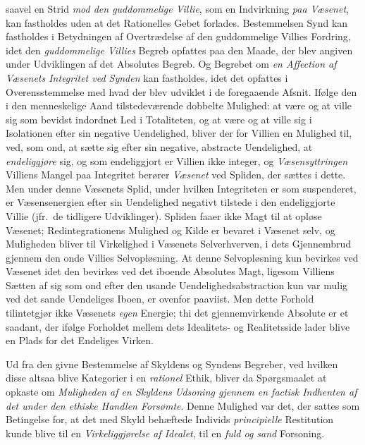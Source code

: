 saavel en Strid \emph{mod den guddommelige Villie}, som en Indvirkning \emph{paa
Væsenet}, kan fastholdes uden at det Rationelles Gebet forlades. Bestemmelsen
Synd kan fastholdes i Betydningen af Overtrædelse af den guddommelige Villies
Fordring, idet den \emph{guddommelige Villies} Begreb opfattes paa den Maade, der
blev angiven under Udviklingen af det Absolutes Begreb. Og Begrebet om \emph{en
Affection af Væsenets Integritet ved Synden} kan fastholdes, idet det opfattes i
Overensstemmelse med hvad der blev udviklet i de foregaaende Afsnit. Ifølge den i
den menneskelige Aand tilstedeværende dobbelte Mulighed: at være og at ville sig
som bevidst indordnet Led i Totaliteten, og at være og at ville sig i Isolationen
efter sin negative Uendelighed,
 bliver der for Villien en Mulighed til, ved, som ond, at sætte sig efter sin
negative, abstracte Uendelighed, at \emph{endeliggjøre} sig, og som endeliggjort
er Villien ikke integer, og \emph{Væsensyttringen} Villiens Mangel paa Integritet
berører \emph{Væsenet} ved Spliden, der sættes i dette. Men under denne Væsenets
Splid, under hvilken Integriteten er som suspenderet, er Væsensenergien efter sin
Uendelighed negativt tilstede i den endeliggjorte Villie (jfr.\ de tidligere
Udviklinger). Spliden faaer ikke Magt til at opløse Væsenet; Redintegrationens
Mulighed og Kilde er bevaret i Væsenet selv, og Muligheden bliver til Virkelighed
i Væsenets Selverhverven, i dets Gjennembrud gjennem den onde Villies
Selvopløsning. At denne Selvopløsning kun bevirkes ved Væsenet idet den bevirkes
ved det iboende Absolutes Magt, ligesom Villiens Sætten af sig som ond efter den
usande Uendelighedsabstraction kun var mulig ved det sande Uendeliges Iboen, er
ovenfor paaviist. Men dette Forhold tilintetgjør ikke Væsenets \emph{egen}
Energie; thi det gjennemvirkende Absolute er et saadant, der ifølge Forholdet
mellem dets Idealitets- og Realitetsside lader blive en Plads for det Endeliges
Virken.

Ud fra den givne Bestemmelse af Skyldens og Syndens Begreber, ved hvilken disse
altsaa blive Kategorier i en \emph{rationel} Ethik, bliver da Spørgsmaalet at
opkaste om \emph{Muligheden af en Skyldens Udsoning gjennem en factisk Indhenten
af det under den ethiske Handlen Forsømte}. Denne Mulighed var det, der sattes
som Betingelse for, at det med Skyld behæftede Individs \emph{principielle}
Restitution kunde blive til en \emph{Virkeliggjørelse af Idealet}, til en
\emph{fuld og sand} Forsoning.

